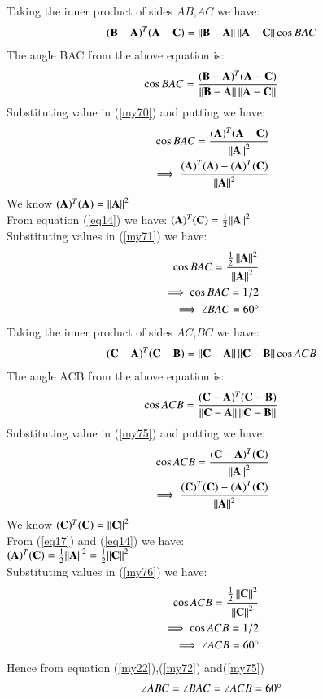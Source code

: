 \documentclass[journal,12pt,twocolumn]{IEEEtran}
\begin{document}
Taking the inner product of sides $AB$,$AC$ we have:
\begin{align}
    (\mathbf{B}-\mathbf{A})^T(\mathbf{A}-\mathbf{C}) =
    \left\lVert\mathbf{B}-\mathbf{A}\right\rVert\left\lVert\mathbf{A}-\mathbf{C}\right\rVert\cos{BAC}
\end{align}
The angle BAC from the  above equation is:
\begin{align}\label{my70}
     \cos{BAC} = \frac{(\mathbf{B}-\mathbf{A})^T(\mathbf{A}-\mathbf{C})}{\left\lVert\mathbf{B}-\mathbf{A}\right\rVert\left\lVert\mathbf{A}-\mathbf{C}\right\rVert} 
\end{align}
Substituting value in (\ref{my70}) and putting we have:
\begin{align}\label{my71}
     \cos{BAC} = \frac{(\mathbf{A})^T(\mathbf{A-C})}{\left\lVert\mathbf{A}\right\rVert^2}\\
     \implies \frac{(\mathbf{A})^T(\mathbf{A})-(\mathbf{A})^T(\mathbf{C})}{\left\lVert\mathbf{A}\right\rVert^2}
\end{align}
We know $(\mathbf{A})^T (\mathbf{A})= {\left\lVert\mathbf{A}\right\rVert^2}$\\
From  equation (\ref{eq14}) we have:
$ (\mathbf{A})^T(\mathbf{C})= \frac{1}{2}{\left\lVert\mathbf{A}\right\rVert^2}$\\
Substituting values in (\ref{my71}) we have:
\begin{align}\label{my72}
\cos{BAC} =
    \frac{{\frac{1}{2}\left\lVert\mathbf{A}\right\rVert^2}}{\left\lVert\mathbf{A}\right\rVert^2}\nonumber\\
     \implies \cos{BAC} = 1/2\nonumber\\
\implies \angle {BAC =60 \degree}
\end{align}
Taking the inner product of sides $AC$,$BC$ we have:
\begin{align}
    (\mathbf{C}-\mathbf{A})^T(\mathbf{C}-\mathbf{B}) =
    \left\lVert\mathbf{C}-\mathbf{A}\right\rVert\left\lVert\mathbf{C}-\mathbf{B}\right\rVert\cos{ACB}
\end{align}
The angle ACB from the  above equation is:
\begin{align}\label{my75}
     \cos{ACB} = \frac{(\mathbf{C}-\mathbf{A})^T(\mathbf{C}-\mathbf{B})}{\left\lVert\mathbf{C}-\mathbf{A}\right\rVert\left\lVert\mathbf{C}-\mathbf{B}\right\rVert} 
\end{align}
Substituting value in (\ref{my75}) and putting we have:
\begin{align}\label{my76}
     \cos{ACB} = \frac{(\mathbf{C-A})^T(\mathbf{C})}{\left\lVert\mathbf{A}\right\rVert^2}\nonumber\\
     \implies \frac{(\mathbf{C})^T(\mathbf{C})-(\mathbf{A})^T(\mathbf{C})}{\left\lVert\mathbf{A}\right\rVert^2}
\end{align}
We know $(\mathbf{C})^T (\mathbf{C})= {\left\lVert\mathbf{C}\right\rVert^2}$\\
From   (\ref{eq17})  and (\ref{eq14})  we have:\\
$(\mathbf{A})^T(\mathbf{C})= \frac{1}{2}{\left\lVert\mathbf{A}\right\rVert^2}=\frac{1}{2}{\left\lVert\mathbf{C}\right\rVert^2}$\\
Substituting values in (\ref{my76}) we have:
\begin{align}\label{my75}
\cos {ACB}=
     \frac{{\frac{1}{2}\left\lVert\mathbf{C}\right\rVert^2}}{\left\lVert\mathbf{C}\right\rVert^2}\\
     \implies \cos{ACB} = 1/2\nonumber\\
\implies \angle {ACB = 60} \degree
\end{align}
Hence from  equation (\ref{my22}),(\ref{my72}) and(\ref{my75})
\begin{align}
\angle {ABC} =\angle {BAC}=\angle {ACB}=60\degree
    \end{align}
\end{document}
